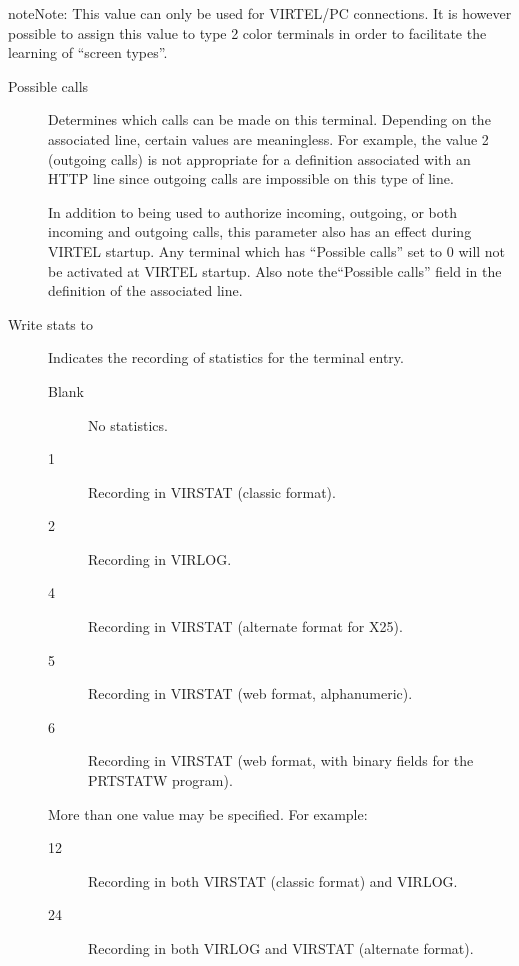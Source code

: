 \documentclass[letterpaper,10pt,english]{sphinxmanual}
\begin{document}
\begin{sphinxadmonition}{note}{Note:}
This value can only be used for VIRTEL/PC connections. It is however possible to assign this value to type 2 color terminals in order to facilitate the learning of “screen types”.
\end{sphinxadmonition}
\begin{description}
\item[{Possible calls}] \leavevmode
Determines which calls can be made on this terminal. Depending on the associated line, certain values are meaningless. For example, the value 2 (outgoing calls) is not appropriate for a definition associated with an HTTP line since outgoing calls are impossible on this type of line.

In addition to being used to authorize incoming, outgoing, or both incoming and outgoing calls, this parameter also has an effect during VIRTEL startup. Any terminal which has “Possible calls” set to 0 will not be activated at VIRTEL startup. Also note the“Possible calls” field in the definition of the associated line.

\item[{Write stats to}] \leavevmode
Indicates the recording of statistics for the terminal entry.
\begin{description}
\item[{Blank}] \leavevmode
No statistics.

\item[{1}] \leavevmode
Recording in VIRSTAT (classic format).

\item[{2}] \leavevmode
Recording in VIRLOG.

\item[{4}] \leavevmode
Recording in VIRSTAT (alternate format for X25).

\item[{5}] \leavevmode
Recording in VIRSTAT (web format, alphanumeric).

\item[{6}] \leavevmode
Recording in VIRSTAT (web format, with binary fields for the PRTSTATW program).

\end{description}

More than one value may be specified. For example:
\begin{description}
\item[{12}] \leavevmode
Recording in both VIRSTAT (classic format) and VIRLOG.

\item[{24}] \leavevmode
Recording in both VIRLOG and VIRSTAT (alternate format).


\end{description}
\end{description}
\end{document}
